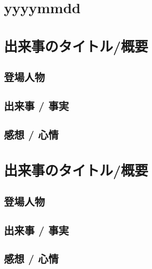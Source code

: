 \section*{yyyymmdd}

\setcounter{section}{0}

\section{出来事のタイトル/概要}

\subsection{登場人物}

\subsection{出来事 / 事実}

\subsection{感想 / 心情}


\section{出来事のタイトル/概要}

\subsection{登場人物}

\subsection{出来事 / 事実}

\subsection{感想 / 心情}
